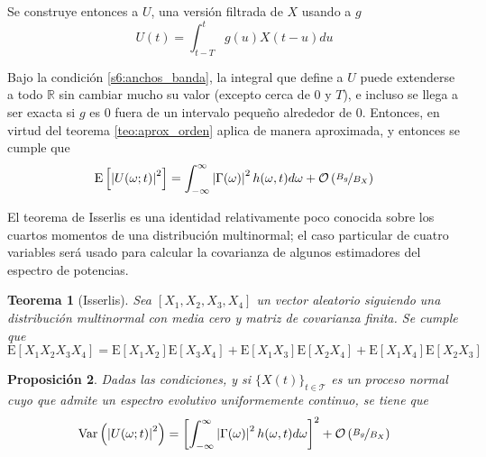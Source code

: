 \documentclass[12pt,letterpaper,draft]{book}
\newtheorem{teorema}{Teorema}[chapter]
\newtheorem{proposicion}[teorema]{Proposición}
\newcommand{\R}{\mathbb{R}}
\newcommand{\intR}{\int_{-\infty}^{\infty}}
\newcommand{\E}[1]{\mathrm{E}\left[ #1 \right]}
\newcommand{\Var}[1]{\mathrm{Var}\left( #1 \right)}
\newcommand{\abso}[1]{\left| #1 \right|}
\newcommand{\xt}{$\{X(t)\}_{t\in \mathcal{T}}$ }
\newcommand{\orden}[1]{\mathcal{O}\left( #1 \right)}
\begin{document}
Se construye entonces a $U$, una versión filtrada de $X$ usando a $g$
\begin{equation}
U(t) = \int_{t-T}^{t} g(u) X(t-u) du
\end{equation}

Bajo la condición \ref{s6:anchos_banda}, la integral que define a $U$ puede extenderse a todo $\R$ sin cambiar mucho su valor (excepto cerca de 0 y $T$), e incluso se llega a ser exacta si $g$ es 0 fuera de un intervalo pequeño alrededor de 0. Entonces, en virtud del teorema \ref{teo:aprox_orden}
aplica de manera aproximada, y entonces se cumple que
\begin{equation}
\E{\abso{U(\omega; t)}^{2}} = \intR \abso{\Gamma(\omega)}^{2} h(\omega, t)d\omega + \orden{\nicefrac{B_g}{B_X}}
\end{equation}


El teorema de Isserlis es una identidad relativamente poco conocida sobre los cuartos momentos de una distribución multinormal; el caso particular de cuatro variables será usado para calcular la covarianza de algunos estimadores del espectro de potencias.

\begin{teorema}[Isserlis]
Sea $[X_1, X_2, X_3, X_4]$ un vector aleatorio siguiendo una distribución multinormal con media cero y matriz de covarianza finita. Se cumple que
\begin{equation}
\E{X_1 X_2 X_3 X_4} = \E{X_1 X_2} \E{X_3 X_4} + \E{X_1 X_3} \E{X_2 X_4} + \E{X_1 X_4} \E{X_2 X_3}
\end{equation}
\label{teo:isserlis}
\end{teorema}

%

\begin{proposicion}
Dadas las condiciones, y si \xt es un proceso normal cuyo que admite un espectro evolutivo uniformemente continuo, se tiene que
\begin{equation}
\Var{\abso{U(\omega;t)}^{2}} = \left[ \intR \abso{\Gamma(\omega)}^{2} h(\omega, t)d\omega \right]^{2} + \orden{\nicefrac{B_g}{B_X}}
\end{equation}
\end{proposicion}
\end{document}
